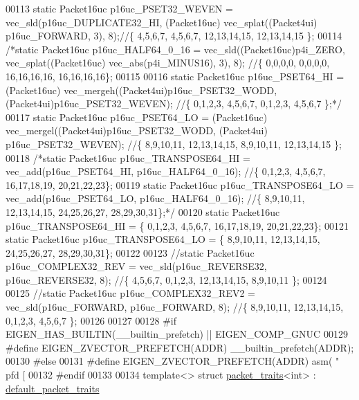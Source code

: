 \begin{DoxyCode}
00113 \textcolor{keyword}{static} Packet16uc p16uc\_PSET32\_WEVEN  = vec\_sld(p16uc\_DUPLICATE32\_HI, (Packet16uc) vec\_splat((Packet4ui)
      p16uc\_FORWARD, 3), 8);\textcolor{comment}{//\{ 4,5,6,7, 4,5,6,7, 12,13,14,15, 12,13,14,15 \};}
00114 \textcolor{comment}{/*static Packet16uc p16uc\_HALF64\_0\_16 = vec\_sld((Packet16uc)p4i\_ZERO, vec\_splat((Packet16uc)
       vec\_abs(p4i\_MINUS16), 3), 8);      //\{ 0,0,0,0, 0,0,0,0, 16,16,16,16, 16,16,16,16\};}
00115 \textcolor{comment}{}
00116 \textcolor{comment}{static Packet16uc p16uc\_PSET64\_HI = (Packet16uc) vec\_mergeh((Packet4ui)p16uc\_PSET32\_WODD,
       (Packet4ui)p16uc\_PSET32\_WEVEN);     //\{ 0,1,2,3, 4,5,6,7, 0,1,2,3, 4,5,6,7 \};*/}
00117 \textcolor{keyword}{static} Packet16uc p16uc\_PSET64\_LO = (Packet16uc) vec\_mergel((Packet4ui)p16uc\_PSET32\_WODD, (Packet4ui)
      p16uc\_PSET32\_WEVEN);     \textcolor{comment}{//\{ 8,9,10,11, 12,13,14,15, 8,9,10,11, 12,13,14,15 \};}
00118 \textcolor{comment}{/*static Packet16uc p16uc\_TRANSPOSE64\_HI = vec\_add(p16uc\_PSET64\_HI, p16uc\_HALF64\_0\_16);                    
                           //\{ 0,1,2,3, 4,5,6,7, 16,17,18,19, 20,21,22,23\};}
00119 \textcolor{comment}{static Packet16uc p16uc\_TRANSPOSE64\_LO = vec\_add(p16uc\_PSET64\_LO, p16uc\_HALF64\_0\_16);                      
                         //\{ 8,9,10,11, 12,13,14,15, 24,25,26,27, 28,29,30,31\};*/}
00120 \textcolor{keyword}{static} Packet16uc p16uc\_TRANSPOSE64\_HI = \{ 0,1,2,3, 4,5,6,7, 16,17,18,19, 20,21,22,23\};
00121 \textcolor{keyword}{static} Packet16uc p16uc\_TRANSPOSE64\_LO = \{ 8,9,10,11, 12,13,14,15, 24,25,26,27, 28,29,30,31\};
00122 
00123 \textcolor{comment}{//static Packet16uc p16uc\_COMPLEX32\_REV = vec\_sld(p16uc\_REVERSE32, p16uc\_REVERSE32, 8);                    
                           //\{ 4,5,6,7, 0,1,2,3, 12,13,14,15, 8,9,10,11 \};}
00124 
00125 \textcolor{comment}{//static Packet16uc p16uc\_COMPLEX32\_REV2 = vec\_sld(p16uc\_FORWARD, p16uc\_FORWARD, 8);                       
                           //\{ 8,9,10,11, 12,13,14,15, 0,1,2,3, 4,5,6,7 \};}
00126 
00127 
00128 \textcolor{preprocessor}{#if EIGEN\_HAS\_BUILTIN(\_\_builtin\_prefetch) || EIGEN\_COMP\_GNUC}
00129 \textcolor{preprocessor}{  #define EIGEN\_ZVECTOR\_PREFETCH(ADDR) \_\_builtin\_prefetch(ADDR);}
00130 \textcolor{preprocessor}{#else}
00131 \textcolor{preprocessor}{  #define EIGEN\_ZVECTOR\_PREFETCH(ADDR) asm( "   pfd [%
00132 \textcolor{preprocessor}{#endif}
00133 
00134 \textcolor{keyword}{template}<> \textcolor{keyword}{struct }\hyperlink{struct_eigen_1_1internal_1_1packet__traits}{packet\_traits}<int>    : \hyperlink{struct_eigen_1_1internal_1_1default__packet__traits}{default\_packet\_traits}
}
\end{DoxyCode}
